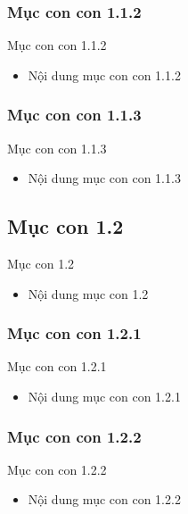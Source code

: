 \documentclass{beamer}
\begin{document}
\subsubsection{Mục con con 1.1.2}
\begin{frame}{Mục con con 1.1.2}
    \begin{itemize}
        \item Nội dung mục con con 1.1.2
    \end{itemize}
\end{frame}

\subsubsection{Mục con con 1.1.3}
\begin{frame}{Mục con con 1.1.3}
    \begin{itemize}
        \item Nội dung mục con con 1.1.3
    \end{itemize}
\end{frame}

\subsection{Mục con 1.2}
\begin{frame}{Mục con 1.2}
    \begin{itemize}
        \item Nội dung mục con 1.2
    \end{itemize}
\end{frame}

\subsubsection{Mục con con 1.2.1}
\begin{frame}{Mục con con 1.2.1}
    \begin{itemize}
        \item Nội dung mục con con 1.2.1
    \end{itemize}
\end{frame}

\subsubsection{Mục con con 1.2.2}
\begin{frame}{Mục con con 1.2.2}
    \begin{itemize}
        \item Nội dung mục con con 1.2.2
    \end{itemize}
\end{frame}
\end{document}
